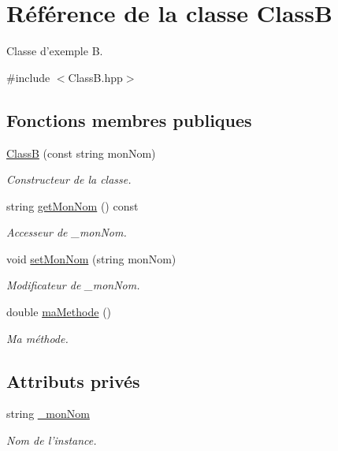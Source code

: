 \hypertarget{class_class_b}{
\section{Référence de la classe ClassB}
\label{class_class_b}
}


Classe d'exemple B.  


{\ttfamily \#include $<$ClassB.hpp$>$}\subsection*{Fonctions membres publiques}
\begin{DoxyCompactItemize}
\item 
\hyperlink{class_class_b_a327bbcde6f569ee4d180d82aa894605e}{ClassB} (const string monNom)
\begin{DoxyCompactList}\small\item\em Constructeur de la classe. \item\end{DoxyCompactList}\item 
string \hyperlink{class_class_b_a52a89bf5f66d82ae413610aea58363ca}{getMonNom} () const 
\begin{DoxyCompactList}\small\item\em Accesseur de \_\-monNom. \item\end{DoxyCompactList}\item 
void \hyperlink{class_class_b_a8294ff99ed4904787e47ca15f07e2ace}{setMonNom} (string monNom)
\begin{DoxyCompactList}\small\item\em Modificateur de \_\-monNom. \item\end{DoxyCompactList}\item 
double \hyperlink{class_class_b_ac17b7f1214a74505d7882ebf9ddcb65e}{maMethode} ()
\begin{DoxyCompactList}\small\item\em Ma méthode. \item\end{DoxyCompactList}\end{DoxyCompactItemize}
\subsection*{Attributs privés}
\begin{DoxyCompactItemize}
\item 
string \hyperlink{class_class_b_a1014a29d4201c63e8ebd40c027eb2fc7}{\_\-monNom}
\begin{DoxyCompactList}\small\item\em Nom de l'instance. \item\end{DoxyCompactList}\end{DoxyCompactItemize}


